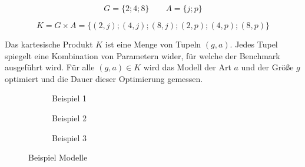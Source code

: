 \begin{equation*}
G=\{2;4;8\}
\qquad A=\{j;p\}
\end{equation*}


\begin{equation*}
K = G \times A = \{(2,j);(4,j);(8,j);(2,p);(4,p);(8,p)\}
\end{equation*}

Das kartesische Produkt $K$ ist eine Menge von Tupeln $(g,a)$. Jedes Tupel
spiegelt eine Kombination von Parametern wider, für welche der Benchmark
ausgeführt wird. Für alle $(g,a) \in K$ wird das Modell der Art $a$ und der
Größe $g$ optimiert und die Dauer dieser Optimierung gemessen.

\begin{figure}
    \begin{subfigure}[b]{0.3\textwidth}
        
        \caption{Beispiel 1}\label{bsp_modell_art_1}
    \end{subfigure}
    \begin{subfigure}[b]{0.3\textwidth}
        
        \caption{Beispiel 2}\label{bsp_modell_art_2}
    \end{subfigure}
    \begin{subfigure}[b]{0.3\textwidth}
        
        \caption{Beispiel 3}\label{bsp_modell_art_3}
    \end{subfigure}
    \caption{Beispiel Modelle}\label{fig:bsp_modell_art}
\end{figure}

